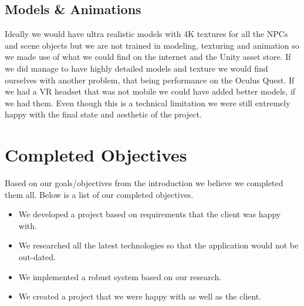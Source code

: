 \subsection{Models \& Animations}
Ideally we would have ultra realistic models with 4K textures for all the NPCs and scene objects but we are not trained in modeling, texturing and animation so we made use of what we could find on the internet and the Unity asset store. If we did manage to have highly detailed models and texture we would find ourselves with another problem, that being performance on the Oculus Quest. If we had a VR headset that was not mobile we could have added better models, if we had them. Even though this is a technical limitation we were still extremely happy with the final state and aesthetic of the project.

\section{Completed Objectives}
Based on our goals/objectives from the introduction we believe we completed them all. Below is a list of our completed objectives.

\begin{itemize}
    \item We developed a project based on requirements that the client was happy with.
    \item We researched all the latest technologies so that the application would not be out-dated.
    \item We implemented a robust system based on our research.
    \item We created a project that we were happy with as well as the client.
\end{itemize}




